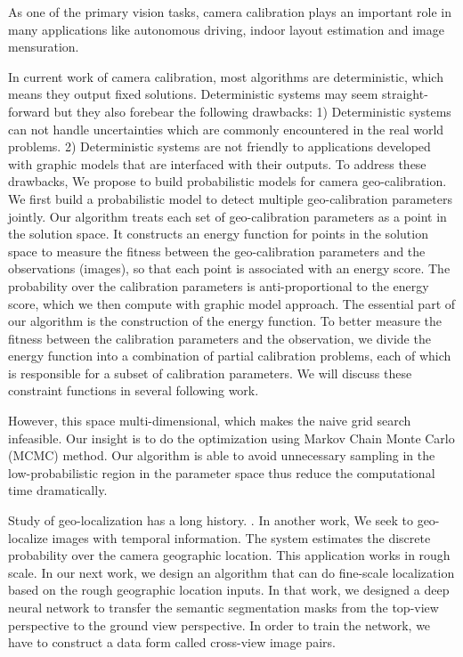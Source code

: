 As one of the primary vision tasks, camera calibration plays an
important role in many applications like autonomous driving, indoor
layout estimation and image mensuration. 


In current work of camera calibration, most algorithms are
deterministic, which means they output fixed solutions. Deterministic
systems may seem straight-forward but they also forebear the following
drawbacks: 1) Deterministic systems can not handle uncertainties which
are commonly encountered in the real world problems.  2) Deterministic
systems are not friendly to applications developed with graphic models
that are interfaced with their outputs.
To address these drawbacks, We propose to build probabilistic
models for camera geo-calibration.
We first build a probabilistic model to detect multiple
geo-calibration parameters jointly.  Our algorithm treats each set of
geo-calibration parameters as a point in the solution space. It
constructs an energy function for points in the solution space to
measure the fitness between the geo-calibration parameters and the
observations (images), so that each point is associated with an energy
score.  The probability over the calibration parameters is
anti-proportional to the energy score, which we then compute with
graphic model approach. The essential part of our algorithm is the
construction of the energy function. To better measure the fitness
between the calibration parameters and the observation, we divide the
energy function into a combination of partial calibration problems,
each of which is responsible for a subset of calibration parameters.
We will discuss these constraint functions in several following work.


However, this space multi-dimensional, which
makes the naive grid search infeasible. Our insight is to do the
optimization using Markov Chain Monte Carlo (MCMC) method. Our
algorithm is able to avoid unnecessary sampling in the
low-probabilistic region in the parameter space thus reduce the
computational time dramatically. 


  Study of geo-localization has a long history. . In
  another work, We seek to geo-localize images with temporal
  information. The system estimates the discrete probability over the
  camera geographic location. This application works in rough scale. In
  our next work, we design an algorithm that can do fine-scale localization
  based on the rough geographic location inputs. In that work, we
  designed a deep neural network to transfer the semantic segmentation
  masks from the top-view perspective to the ground view perspective. In
  order to train the network, we have to construct a data form called
  cross-view image pairs. \newline



